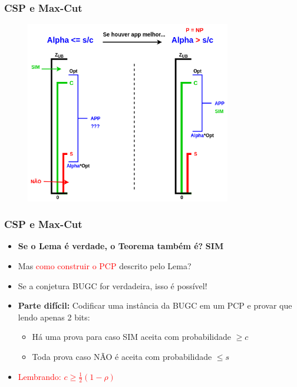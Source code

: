 \documentclass[11pt, handout]{beamer}
\newcommand{\red}[1]{\textcolor{red}{#1}}
\newcommand{\green}[1]{\textcolor{pine}{#1}}
\begin{document}
\begin{frame}[<+->]
\frametitle{CSP e Max-Cut}
    \begin{figure}
            \includegraphics[width=0.8\textwidth]{images/gap.png}
    \end{figure}{}
\end{frame}{}

\begin{frame}[<+->]
\frametitle{CSP e Max-Cut}
    \begin{itemize}
        \item \textbf{Se o Lema é verdade, o Teorema também é?} \textcolor{pine}{\textbf{SIM}}
        \item Mas \red{como construir o PCP} descrito pelo Lema?
        \item Se a conjetura BUGC for verdadeira, isso é possível!
        \item \textbf{Parte difícil:} Codificar uma instância da BUGC em um PCP e provar que lendo apenas 2 bits:
        \begin{itemize}
            \item Há uma prova para \green{caso SIM aceita com probabilidade $\geq c$}
            \item Toda prova caso NÃO é aceita com probabilidade $\leq s$
        \end{itemize}
        \item \red{Lembrando: $c \geq \frac{1}{2}(1-\rho)$ }
    \end{itemize}
\end{frame}{}
\end{document}
